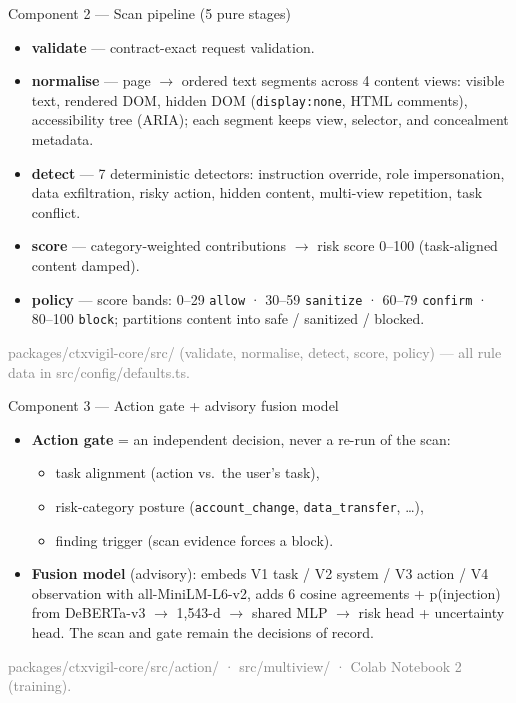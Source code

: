 \documentclass[aspectratio=169]{beamer}
\newcommand{\src}[1]{{\footnotesize\textcolor{gray}{#1}}}
\begin{document}
\begin{frame}{Component 2 --- Scan pipeline (5 pure stages)}
\begin{itemize}
  \item \textbf{validate} --- contract-exact request validation.
  \item \textbf{normalise} --- page $\rightarrow$ ordered text segments across 4 content views: visible text, rendered DOM, hidden DOM (\texttt{display:none}, HTML comments), accessibility tree (ARIA); each segment keeps view, selector, and concealment metadata.
  \item \textbf{detect} --- 7 deterministic detectors: instruction override, role impersonation, data exfiltration, risky action, hidden content, multi-view repetition, task conflict.
  \item \textbf{score} --- category-weighted contributions $\rightarrow$ risk score 0--100 (task-aligned content damped).
  \item \textbf{policy} --- score bands: 0--29 \texttt{allow} · 30--59 \texttt{sanitize} · 60--79 \texttt{confirm} · 80--100 \texttt{block}; partitions content into safe / sanitized / blocked.
\end{itemize}
\src{packages/ctxvigil-core/src/ (validate, normalise, detect, score, policy) --- all rule data in src/config/defaults.ts.}
\end{frame}

\begin{frame}{Component 3 --- Action gate + advisory fusion model}
\begin{itemize}
  \item \textbf{Action gate} = an independent decision, never a re-run of the scan:
  \begin{itemize}
    \item task alignment (action vs.\ the user's task),
    \item risk-category posture (\texttt{account\_change}, \texttt{data\_transfer}, \dots),
    \item finding trigger (scan evidence forces a block).
  \end{itemize}
  \item \textbf{Fusion model} (advisory): embeds V1 task / V2 system / V3 action / V4 observation with all-MiniLM-L6-v2, adds 6 cosine agreements + p(injection) from DeBERTa-v3 $\rightarrow$ 1{,}543-d $\rightarrow$ shared MLP $\rightarrow$ risk head + uncertainty head. The scan and gate remain the decisions of record.
\end{itemize}
\src{packages/ctxvigil-core/src/action/ · src/multiview/ · Colab Notebook 2 (training).}
\end{frame}
\end{document}
